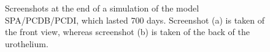 \begin{figure}[ht]
\begin{center}
\end{center}
\begin{center}
\end{center}
\caption[Simulated urothel with the model SPA/PCDB/PCDI at day 700]{\label{img:720daysScreenshotSPA/BCPD/IPCD}Screenshots at the end of a simulation of the model SPA/PCDB/PCDI, which lasted 700 days. Screenshot (a) is taken of the front view, whereas screenshot (b) is taken of the back of the urothelium.}

\end{figure}



